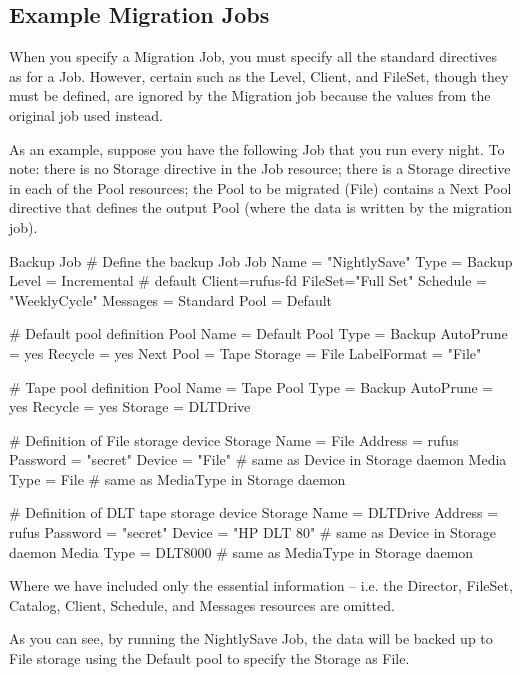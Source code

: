 \subsection{Example Migration Jobs}

When you specify a Migration Job, you must specify all the standard
directives as for a Job.  However, certain such as the Level, Client, and
FileSet, though they must be defined, are ignored by the Migration job
because the values from the original job used instead.

As an example, suppose you have the following Job that
you run every night. To note: there is no Storage directive in the
Job resource; there is a Storage directive in each of the Pool
resources; the Pool to be migrated (File) contains a Next Pool
directive that defines the output Pool (where the data is written
by the migration job).

\begin{bconfig}{Backup Job}
# Define the backup Job
Job {
  Name = "NightlySave"
  Type = Backup
  Level = Incremental                 # default
  Client=rufus-fd
  FileSet="Full Set"
  Schedule = "WeeklyCycle"
  Messages = Standard
  Pool = Default
}

# Default pool definition
Pool {
  Name = Default
  Pool Type = Backup
  AutoPrune = yes
  Recycle = yes
  Next Pool = Tape
  Storage = File
  LabelFormat = "File"
}

# Tape pool definition
Pool {
  Name = Tape
  Pool Type = Backup
  AutoPrune = yes
  Recycle = yes
  Storage = DLTDrive
}

# Definition of File storage device
Storage {
  Name = File
  Address = rufus
  Password = "secret"
  Device = "File"          # same as Device in Storage daemon
  Media Type = File        # same as MediaType in Storage daemon
}

# Definition of DLT tape storage device
Storage {
  Name = DLTDrive
  Address = rufus
  Password = "secret"
  Device = "HP DLT 80"      # same as Device in Storage daemon
  Media Type = DLT8000      # same as MediaType in Storage daemon
}
\end{bconfig}

Where we have included only the essential information -- i.e. the
Director, FileSet, Catalog, Client, Schedule, and Messages resources are
omitted.

As you can see, by running the NightlySave Job, the data will be backed up
to File storage using the Default pool to specify the Storage as File.

